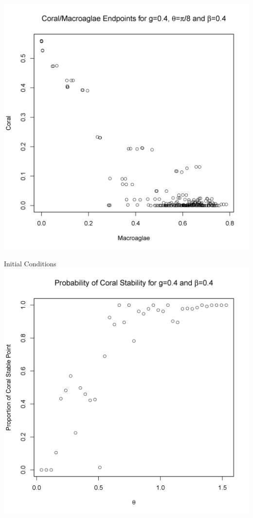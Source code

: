 
\begin{frame}
\includegraphics[scale=.325]{scatter_lgcoral_gpt4_betapt4_theta10.png}
\end{frame}

\begin{frame}{Initial Conditions}
\includegraphics[scale=.325]{scatter_gpt4_betapt4.png}
\end{frame}

